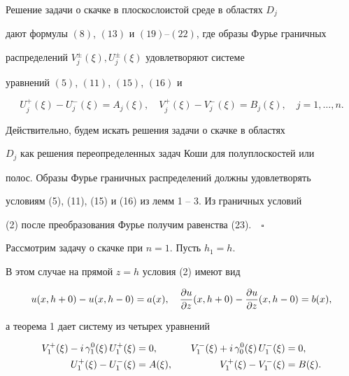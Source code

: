 \begin{thm}


Решение задачи о скачке в плоскослоистой среде в областях $D_j$


дают формулы $(8)$, $(13)$ и $(19)$--$(22)$, где образы Фурье граничных


распределений $V^{\pm}_j(\xi), U^{\pm}_j(\xi)$ удовлетворяют системе


уравнений $(5)$, $(11)$, $(15)$, $(16)$ и


\begin{equation}


U^+_j(\xi) - U^-_j(\xi) = A_j(\xi),\quad


V^+_j(\xi) - V^-_j(\xi) = B_j(\xi),\quad j=1,\dotsc,n .


\end{equation}


\end{thm}





Действительно, будем искать решения задачи о скачке в областях


$D_j$ как решения переопределенных задач Коши для полуплоскостей или


полос. Образы Фурье граничных распределений должны удовлетворять


условиям (5), (11), (15) и (16) из лемм 1 -- 3. Из граничных условий


(2) после преобразования Фурье получим равенства (23).$\quad\square$


\medskip





Рассмотрим задачу о скачке при $n=1$. Пусть $h_1=h$.


В этом случае на прямой $z=h$ условия (2) имеют вид


\begin{equation}


u(x,h+0)-u(x,h-0) = a(x),\quad


\frac{\pa u}{\pa z}(x,h+0)-\frac{\pa u}{\pa z}(x,h-0) = b(x) ,


\end{equation}


а теорема 1 дает систему из четырех уравнений


\begin{alignat*}{2}


V_1^+(\xi)-i\,\gaoxi{1}\,U_1^+(\xi) &=0, &\quad


V_1^-(\xi)+i\,\gaoxi{0}\,U_1^-(\xi) &=0, \\


%


U_1^+(\xi)-U_1^-(\xi)&=A(\xi), &\quad


V_1^+(\xi)-V_1^-(\xi)&=B(\xi) . 


\end{alignat*}


